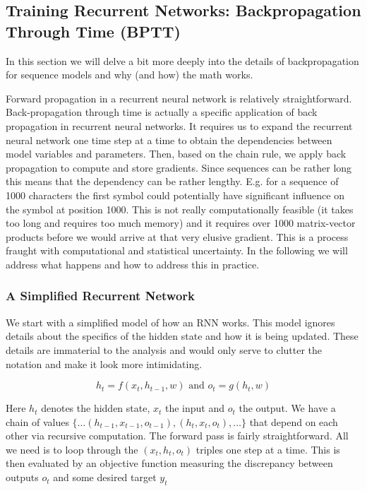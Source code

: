 \subsection{Training Recurrent Networks: Backpropagation Through Time (BPTT)}

In this section we will delve a bit more deeply into the details of backpropagation for sequence models and why (and how) the math works.

Forward propagation in a recurrent neural network is relatively straightforward. Back-propagation through time is actually a specific application of back propagation in recurrent neural networks. It requires us to expand the recurrent neural network one time step at a time to obtain the dependencies between model variables and parameters. Then, based on the chain rule, we apply back propagation to compute and store gradients. Since sequences can be rather long this means that the dependency can be rather lengthy. E.g. for a sequence of 1000 characters the first symbol could potentially have significant influence on the symbol at position 1000. This is not really computationally feasible (it takes too long and requires too much memory) and it requires over 1000 matrix-vector products before we would arrive at that very elusive gradient. This is a process fraught with computational and statistical uncertainty. In the following we will address what happens and how to address this in practice.

\subsubsection{A Simplified Recurrent Network}

We start with a simplified model of how an RNN works. This model ignores details about the specifics of the hidden state and how it is being updated. These details are immaterial to the analysis and would only serve to clutter the notation and make it look more intimidating.

$$h_t = f(x_t, h_{t-1}, w) \text{ and } o_t = g(h_t, w)$$

Here $h_t$ denotes the hidden state, $x_t$ the input and $o_t$ the output. We have a chain of values $\{\ldots (h_{t-1}, x_{t-1}, o_{t-1}), (h_{t}, x_{t}, o_t), \ldots\}$ that depend on each other via recursive computation. The forward pass is fairly straightforward. All we need is to loop through the $(x_t, h_t, o_t)$ triples one step at a time. This is then evaluated by an objective function measuring the discrepancy between outputs $o_t$ and some desired target $y_t$

